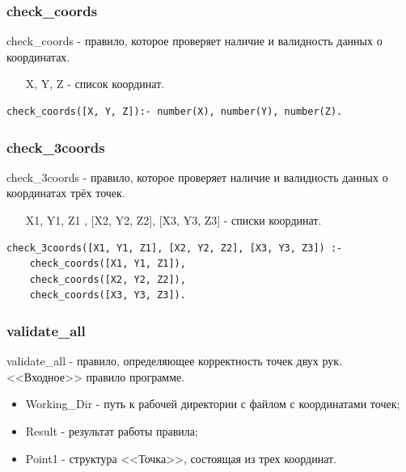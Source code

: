 \subsubsection{check\_coords}
\hspace{0.6cm} check\_coords - правило, которое проверяет наличие и валидность данных о координатах.

\begin{itemize}
	\item [X, Y, Z] - список координат.
\end{itemize}

\begin{lstlisting}[caption=Реализация правила check\_coords, label=rules:checkcoords]
check_coords([X, Y, Z]):- number(X), number(Y), number(Z).
\end{lstlisting}

\subsubsection{check\_3coords}
\hspace{0.6cm} check\_3coords - правило, которое проверяет наличие и валидность данных о координатах трёх точек.

\begin{itemize}
	\item [X1, Y1, Z1], [X2, Y2, Z2], [X3, Y3, Z3] - списки координат.
\end{itemize}

\begin{lstlisting}[caption=Реализация правила check\_3coords, label=rules:check3coords]
check_3coords([X1, Y1, Z1], [X2, Y2, Z2], [X3, Y3, Z3]) :-
	check_coords([X1, Y1, Z1]),
	check_coords([X2, Y2, Z2]),
	check_coords([X3, Y3, Z3]).
\end{lstlisting}

\subsubsection{validate\_all}
\hspace{0.6cm} validate\_all - правило, определяющее корректность точек двух рук. <<Входное>> правило программе.

\begin{itemize}
	\item Working\_Dir - путь к рабочей директории с файлом с координатами точек;
	\item Result - результат работы правила;
	\item Point1 - структура <<Точка>>, состоящая из трех координат.
\end{itemize}

